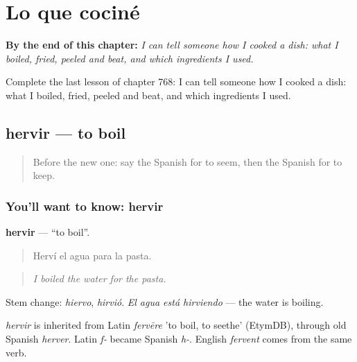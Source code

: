 
\chapter{Lo que cociné}
\label{ch:es-lo-que-cocine}

\begin{chapteropening}
\textbf{By the end of this chapter:} \emph{I can tell someone how I cooked a dish: what I boiled, fried, peeled and beat, and which ingredients I used.}

Complete the last lesson of chapter 768: I can tell someone how I cooked a dish: what I boiled, fried, peeled and beat, and which ingredients I used.
\end{chapteropening}

\section[hervir]{hervir — to boil}

\label{lesson:ES-C768-hervir}



\begin{quote}
Before the new one: say the Spanish for to seem, then the Spanish for to keep.
\end{quote}

\subsection*{You'll want to know: hervir}
\textbf{hervir} — \textquotedblleft{}to boil\textquotedblright{}.

\begin{quote}
Herví el agua para la pasta.
\end{quote}

\begin{quote}
\emph{I boiled the water for the pasta.}
\end{quote}

Stem change: \emph{hiervo}, \emph{hirvió}. \emph{El agua está hirviendo} — the water is boiling.

\begin{cousinweb}
\emph{hervir} is inherited from Latin \emph{fervēre} 'to boil, to seethe' (EtymDB), through old Spanish \emph{herver}. Latin \emph{f-} became Spanish \emph{h-}. English \emph{fervent} comes from the same verb.
\end{cousinweb}

